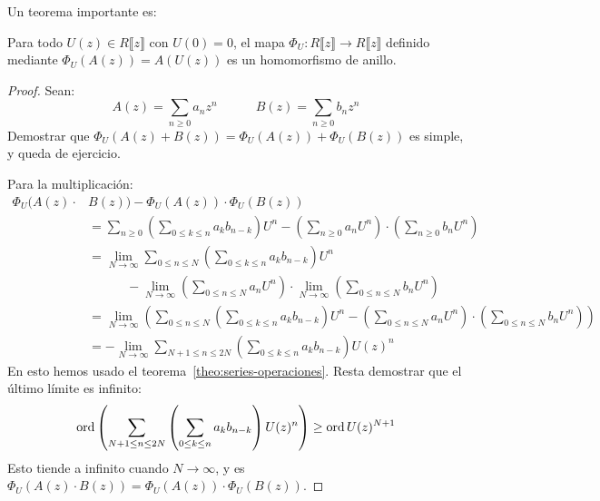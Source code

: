   Un teorema importante es:
  \begin{theorem}
    \label{theo:series-composicion-homomorfismo}
    Para todo \(U(z) \in R \llbracket z \rrbracket\)
    con \(U(0) = 0\),
    el mapa
      \(\Phi_U \colon
	  R \llbracket z \rrbracket \rightarrow R \llbracket z \rrbracket\)
    definido mediante \(\Phi_U(A(z)) = A(U(z))\)
    es un homomorfismo de anillo.
  \end{theorem}
  \begin{proof}
    Sean:
    \begin{equation*}
      A(z)
	= \sum_{n \ge 0} a_n z^n
      \hspace{3em}
      B(z)
	= \sum_{n \ge 0} b_n z^n
    \end{equation*}
    Demostrar que \(\Phi_U(A(z) + B(z)) = \Phi_U(A(z)) + \Phi_U(B(z))\)
    es simple,
    y queda de ejercicio.

    Para la multiplicación:
    \begin{align*}
      \Phi_U(A(z) \cdot &B(z)) - \Phi_U(A(z)) \cdot \Phi_U(B(z)) \\
	&= \sum_{n \ge 0}
	     \left(
	       \sum_{0 \le k \le n} a_k b_{n - k}
	     \right) U^n
	    - \left(
		\sum_{n\ge 0} a_n U^n
	      \right) \cdot
		\left(
		  \sum_{n\ge 0} b_n U^n
		\right) \\
	&= \lim_{N \rightarrow \infty}
	     \sum_{0 \le n \le N}
	       \left(
		 \sum_{0 \le k \le n} a_k b_{n - k}
	       \right) U^n \\
	&\hspace{3em}
	    - \lim_{N \rightarrow \infty}
		\left(
		  \sum_{0 \le n \le N} a_n U^n
		\right) \cdot
		  \lim_{N \rightarrow \infty}
		    \left(
		      \sum_{0 \le n \le N} b_n U^n
		    \right) \\
	 &= \lim_{N \rightarrow \infty}
	      \left(
		\sum_{0 \le n \le N}
		  \left(
		    \sum_{0 \le k \le n} a_k b_{n - k}
		  \right) U^n
		- \left(
		    \sum_{0 \le n \le N} a_n U^n
		  \right) \cdot
		    \left(
		      \sum_{0 \le n \le N} b_n U^n
		    \right)
	      \right) \\
	 &= - \lim_{N \rightarrow \infty}
		\sum_{N + 1 \le n \le 2 N}
		  \left(
		    \sum_{0 \le k \le n} a_k b_{n - k}
		  \right) U(z)^n
    \end{align*}
    En esto hemos usado el teorema~\ref{theo:series-operaciones}.
    Resta demostrar que el último límite es infinito:
    \begin{equation*}
      \operatorname{ord}
	\left(
	  \sum_{N + 1 \le n \le 2 N}
	    \left(
	      \sum_{0 \le k \le n} a_k b_{n - k}
	    \right) U(z)^n
	\right)
	\ge \operatorname{ord} U(z)^{N + 1}
    \end{equation*}
    Esto tiende a infinito cuando \(N \rightarrow \infty\),
    y es \(\Phi_U(A(z) \cdot B(z)) = \Phi_U(A(z)) \cdot \Phi_U(B(z))\).
  \end{proof}
